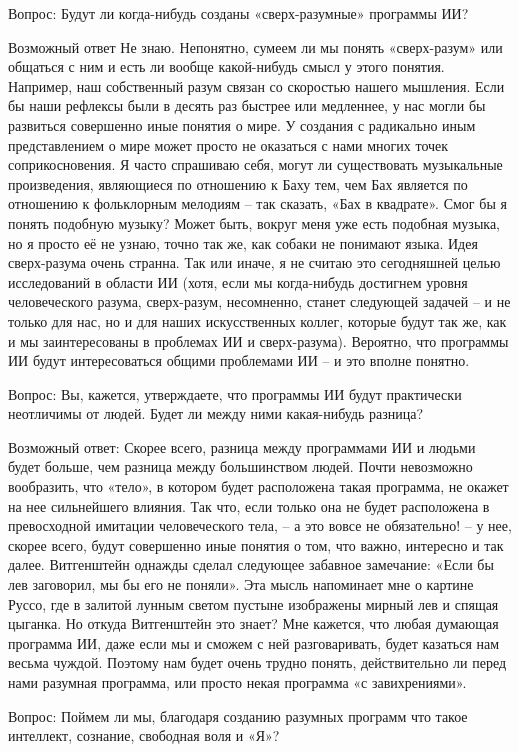 \documentclass[../main.tex]{subfiles}
\begin{document}
Вопрос: Будут ли когда-нибудь созданы «сверх-разумные» программы ИИ?

Возможный ответ Не знаю. Непонятно, сумеем ли мы понять «сверх-разум» или общаться с ним и есть ли вообще какой-нибудь смысл у этого понятия. Например, наш собственный разум связан со скоростью нашего мышления. Если бы наши рефлексы были в десять раз быстрее или медленнее, у нас могли бы развиться совершенно иные понятия о мире. У создания с радикально иным представлением о мире может просто не оказаться с нами многих точек соприкосновения. Я часто спрашиваю себя, могут ли существовать музыкальные произведения, являющиеся по отношению к Баху тем, чем Бах является по отношению к фольклорным мелодиям \--- так сказать, «Бах в квадрате». Смог бы я понять подобную музыку? Может быть, вокруг меня уже есть подобная музыка, но я просто её не узнаю, точно так же, как собаки не понимают языка. Идея сверх-разума очень странна. Так или иначе, я не считаю это сегодняшней целью исследований в области ИИ (хотя, если мы когда-нибудь достигнем уровня человеческого разума, сверх-разум, несомненно, станет следующей задачей \--- и не только для нас, но и для наших искусственных коллег, которые будут так же, как и мы заинтересованы в проблемах ИИ и сверх-разума). Вероятно, что программы ИИ будут интересоваться общими проблемами ИИ \--- и это вполне понятно.

Вопрос: Вы, кажется, утверждаете, что программы ИИ будут практически неотличимы от людей. Будет ли между ними какая-нибудь разница?

Возможный ответ: Скорее всего, разница между программами ИИ и людьми будет больше, чем разница между большинством людей. Почти невозможно вообразить, что «тело», в котором будет расположена такая программа, не окажет на нее сильнейшего влияния. Так что, если только она не будет расположена в превосходной имитации человеческого тела, \--- а это вовсе не обязательно! \--- у нее, скорее всего, будут совершенно иные понятия о том, что важно, интересно и так далее. Витгенштейн однажды сделал следующее забавное замечание: «Если бы лев заговорил, мы бы его не поняли». Эта мысль напоминает мне о картине Руссо, где в залитой лунным светом пустыне изображены мирный лев и спящая цыганка. Но откуда Витгенштейн это знает? Мне кажется, что любая думающая программа ИИ, даже если мы и сможем с ней разговаривать, будет казаться нам весьма чуждой. Поэтому нам будет очень трудно понять, действительно ли перед нами разумная программа, или просто некая программа «с завихрениями».

Вопрос: Поймем ли мы, благодаря созданию разумных программ что такое интеллект, сознание, свободная воля и «Я»?
\end{document}
